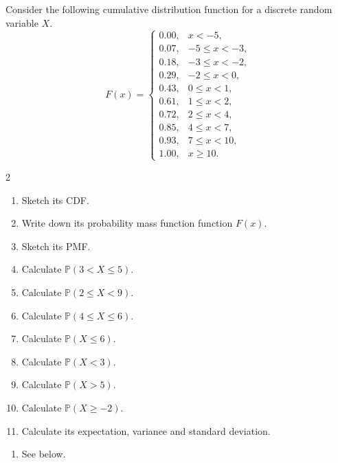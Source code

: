 \documentclass[../main.tex]{subfiles}
\begin{document}
\begin{exercise}
  Consider the following cumulative distribution function for a discrete random variable \(X\).
  \[
    F(x) =
    \begin{cases}
      0.00, & x < -5, \\[4pt]
      0.07, & -5 \le x < -3, \\[4pt]
      0.18, & -3 \le x < -2, \\[4pt]
      0.29, & -2 \le x < 0, \\[4pt]
      0.43, & 0 \le x < 1, \\[4pt]
      0.61, & 1 \le x < 2, \\[4pt]
      0.72, & 2 \le x < 4, \\[4pt]
      0.85, & 4 \le x < 7, \\[4pt]
      0.93, & 7 \le x < 10, \\[4pt]
      1.00, & x \ge 10.
    \end{cases}
  \]

  \begin{multicols}{2}
    \begin{enumerate}
      \item Sketch its CDF.
      \item Write down its probability mass function function \(F(x)\).
      \item Sketch its PMF.
      \item Calculate \(\mathbb{P}(3 < X \le 5)\).
      \item Calculate \(\mathbb{P}(2 \le X < 9)\).
      \item Calculate \(\mathbb{P}(4 \le X \le 6)\).
      \item Calculate \(\mathbb{P}(X \le 6)\).
      \item Calculate \(\mathbb{P}(X < 3)\).
      \item Calculate \(\mathbb{P}(X > 5)\).
      \item Calculate \(\mathbb{P}(X \ge -2)\).
      \item Calculate its expectation, variance and standard deviation.
    \end{enumerate}
  \end{multicols}

  \begin{solution}
    \begin{enumerate}
      \item See below.


\end{enumerate}
\end{solution}
\end{exercise}
\end{document}
